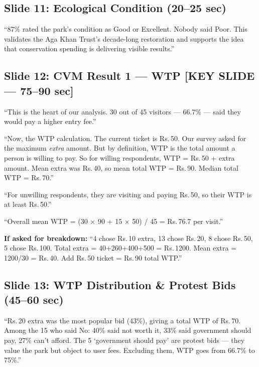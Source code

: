 \documentclass[11pt, a4paper]{article}
\newcommand{\rupee}{Rs.\,}
\newenvironment{ansbox}{%
    \def\FrameCommand{\textcolor{darkgreen}{\vrule width 2pt}\hspace{8pt}}%
    \MakeFramed{\advance\hsize-\width\FrameRestore}%
}{%
    \endMakeFramed%
}
\begin{document}
\subsection{Slide 11: Ecological Condition \normalfont\small(20--25 sec)}
\begin{ansbox}
``87\% rated the park's condition as Good or Excellent. Nobody said Poor. This validates the Aga Khan Trust's decade-long restoration and supports the idea that conservation spending is delivering visible results.''
\end{ansbox}

\subsection{Slide 12: CVM Result 1 --- WTP \normalfont\small\textcolor{alertred}{[KEY SLIDE --- 75--90 sec]}}
\begin{ansbox}
``This is the heart of our analysis. 30 out of 45 visitors --- 66.7\% --- said they would pay a higher entry fee.''

``Now, the WTP calculation. The current ticket is \rupee 50. Our survey asked for the maximum \textit{extra} amount. But by definition, WTP is the total amount a person is willing to pay. So for willing respondents, WTP = \rupee 50 + extra amount. Mean extra was \rupee 40, so mean total WTP = \rupee 90. Median total WTP = \rupee 70.''

``For unwilling respondents, they are visiting and paying \rupee 50, so their WTP is at least \rupee 50.''

``Overall mean WTP = (30 $\times$ 90 + 15 $\times$ 50) / 45 = \rupee 76.7 per visit.''

\textbf{If asked for breakdown:} ``4 chose \rupee 10 extra, 13 chose \rupee 20, 8 chose \rupee 50, 5 chose \rupee 100. Total extra = 40+260+400+500 = \rupee 1200. Mean extra = 1200/30 = \rupee 40. Add \rupee 50 ticket = \rupee 90 total WTP.''
\end{ansbox}

\subsection{Slide 13: WTP Distribution \& Protest Bids \normalfont\small(45--60 sec)}
\begin{ansbox}
``\rupee 20 extra was the most popular bid (43\%), giving a total WTP of \rupee 70. Among the 15 who said No: 40\% said not worth it, 33\% said government should pay, 27\% can't afford. The 5 `government should pay' are protest bids --- they value the park but object to user fees. Excluding them, WTP goes from 66.7\% to 75\%.''
\end{ansbox}
\end{document}
